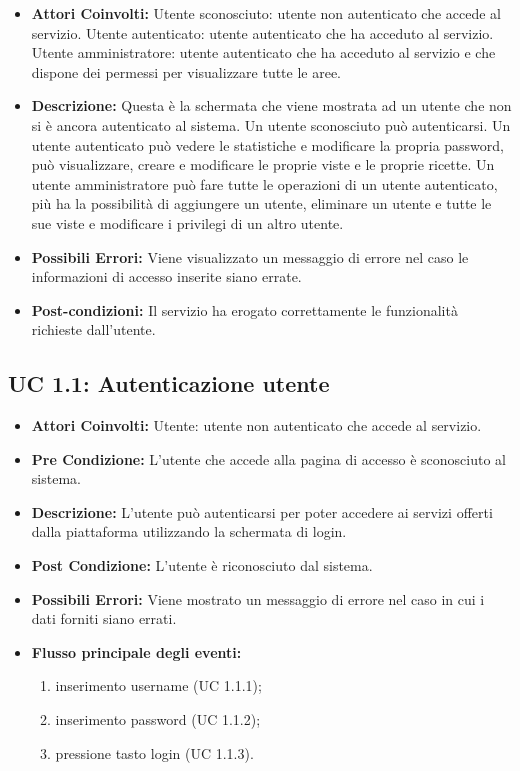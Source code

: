 \begin{itemize}

\item \textbf{Attori Coinvolti:}
Utente sconosciuto: utente non autenticato che accede al servizio.
Utente autenticato: utente autenticato che ha acceduto al servizio.
Utente amministratore: utente autenticato che ha acceduto al servizio e che dispone dei permessi per visualizzare tutte le aree.

\item \textbf{Descrizione:}
Questa è la schermata che viene mostrata ad un utente che non si è ancora autenticato al sistema.
Un utente sconosciuto può autenticarsi. 
Un utente autenticato può vedere le statistiche e modificare la propria password, può visualizzare, creare e modificare le proprie viste e le proprie ricette. 
Un utente amministratore può fare tutte le operazioni di un utente autenticato, più ha la possibilità di aggiungere un utente, eliminare un utente e tutte le sue viste e modificare i privilegi di un altro utente.

\item \textbf{Possibili Errori:}
Viene visualizzato un messaggio di errore nel caso le informazioni di accesso inserite siano errate.

\item \textbf{Post-condizioni:}
Il servizio ha erogato correttamente le funzionalità richieste dall'utente.

\end{itemize}

\subsection{UC 1.1: Autenticazione utente}

\begin{itemize}
\item \textbf{Attori Coinvolti:}
Utente: utente non autenticato che accede al servizio.
\item \textbf{Pre Condizione:}
L'utente che accede alla pagina di accesso è sconosciuto al sistema.
\item \textbf{Descrizione:}
L'utente può autenticarsi per poter accedere ai servizi offerti dalla piattaforma utilizzando la schermata di login.
\item \textbf{Post Condizione:}
L'utente è riconosciuto dal sistema.
\item \textbf{Possibili Errori:}
Viene mostrato un messaggio di errore nel caso in cui i dati forniti siano errati.
\item \textbf{Flusso principale degli eventi:}

\begin{enumerate}
\item inserimento username (UC 1.1.1);
\item inserimento password (UC 1.1.2);
\item pressione tasto login (UC 1.1.3).
\end{enumerate}

\end{itemize}

